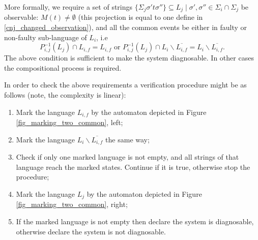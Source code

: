 \documentclass[a4paper, 10pt, conference]{ieeeconf} \IEEEoverridecommandlockouts
\begin{document}
More formally, we require a set of strings 
$\{\Sigma_j \sigma't\sigma''\} \subseteq L_j \mid \sigma', 
\sigma'' \in \Sigma_i \cap \Sigma_j$ be observable: $M(t) \neq \emptyset$
(this projection is equal to one define in \ref{cnj_changed_observation}),
and all the common events be either in faulty or non-faulty sub-language of
$L_i$, i.e 
$$
	P_{i,j}^{-1}(L_j) \cap L_{i,f} = L_{i,f} \textrm{ or } 
	P_{i,j}^{-1}(L_j) \cap L_i\backslash \overline{L_{i,f}} 
	= L_i\backslash \overline{L_{i,f}}.
$$
The above condition is sufficient to make the system diagnosable. In other cases
the compositional process is required.

In order to check the above requirements a verification procedure might be as
follows (note, the complexity is linear):
\begin{enumerate}
  \item Mark the language $L_{i,f}$ by the automaton depicted in Figure
  \ref{fig_marking_two_common}, left;
  \item Mark the language $L_i\backslash \overline{L_{i,f}}$ the same way;
  \item Check if only one marked language is not empty, and all strings of that
  language reach the marked states. Continue if it is true, otherwise stop the
  procedure;
  \item Mark the language $L_j$ by the automaton depicted in Figure
  \ref{fig_marking_two_common}, right;
  \item If the marked language is not empty then declare the system is
  diagnosable, otherwise declare the system is not diagnosable.
\end{enumerate}
\end{document}
